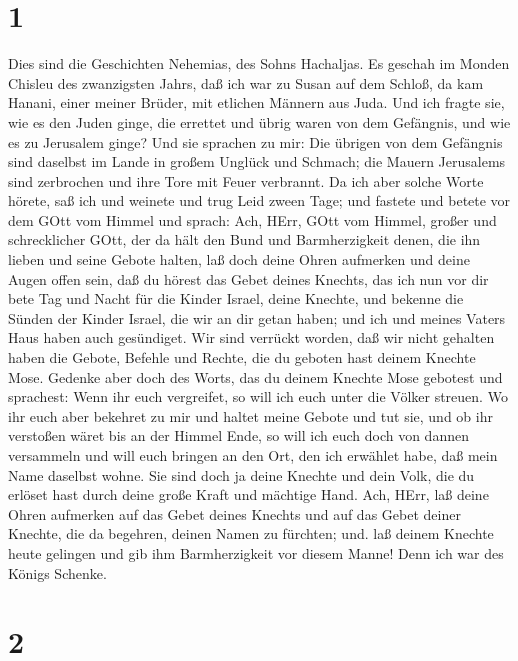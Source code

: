 \hypertarget{section}{%
\section{1}\label{section}}

 Dies sind die Geschichten Nehemias, des Sohns Hachaljas. Es
geschah im Monden Chisleu des zwanzigsten Jahrs, daß ich war zu Susan
auf dem Schloß,  da kam Hanani, einer meiner Brüder, mit
etlichen Männern aus Juda. Und ich fragte sie, wie es den Juden ginge,
die errettet und übrig waren von dem Gefängnis, und wie es zu Jerusalem
ginge?  Und sie sprachen zu mir: Die übrigen von dem
Gefängnis sind daselbst im Lande in großem Unglück und Schmach; die
Mauern Jerusalems sind zerbrochen und ihre Tore mit Feuer verbrannt.
 Da ich aber solche Worte hörete, saß ich und weinete und
trug Leid zween Tage; und fastete und betete vor dem GOtt vom Himmel
 und sprach: Ach, HErr, GOtt vom Himmel, großer und
schrecklicher GOtt, der da hält den Bund und Barmherzigkeit denen, die
ihn lieben und seine Gebote halten,  laß doch deine Ohren
aufmerken und deine Augen offen sein, daß du hörest das Gebet deines
Knechts, das ich nun vor dir bete Tag und Nacht für die Kinder Israel,
deine Knechte, und bekenne die Sünden der Kinder Israel, die wir an dir
getan haben; und ich und meines Vaters Haus haben auch gesündiget.
 Wir sind verrückt worden, daß wir nicht gehalten haben die
Gebote, Befehle und Rechte, die du geboten hast deinem Knechte Mose.
 Gedenke aber doch des Worts, das du deinem Knechte Mose
gebotest und sprachest: Wenn ihr euch vergreifet, so will ich euch unter
die Völker streuen.  Wo ihr euch aber bekehret zu mir und
haltet meine Gebote und tut sie, und ob ihr verstoßen wäret bis an der
Himmel Ende, so will ich euch doch von dannen versammeln und will euch
bringen an den Ort, den ich erwählet habe, daß mein Name daselbst wohne.
 Sie sind doch ja deine Knechte und dein Volk, die du
erlöset hast durch deine große Kraft und mächtige Hand. 
Ach, HErr, laß deine Ohren aufmerken auf das Gebet deines Knechts und
auf das Gebet deiner Knechte, die da begehren, deinen Namen zu fürchten;
und. laß deinem Knechte heute gelingen und gib ihm Barmherzigkeit vor
diesem Manne! Denn ich war des Königs Schenke.

\hypertarget{section-1}{%
\section{2}\label{section-1}}

